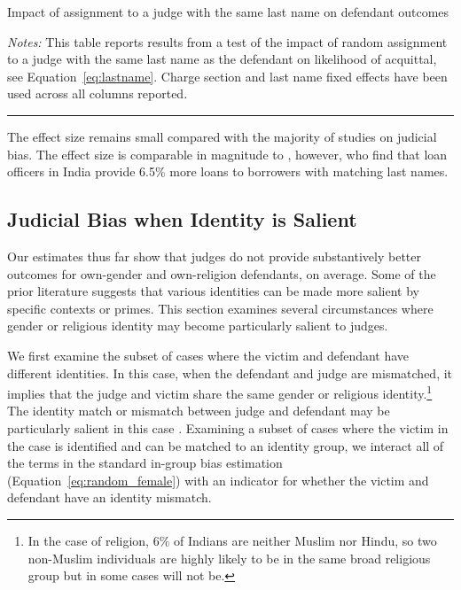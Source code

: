 \documentclass[12pt,english]{article}
\begin{document}
\begin{table}
  \begin{center}
    \caption{Impact of assignment to a judge with the same last name on defendant outcomes}
    \label{tab:last_name}
    
  \begin{minipage}{0.90\textwidth}
    \footnotesize \emph{Notes:} This table reports results from a test of the impact of random assignment to a judge with the same last name as the defendant on likelihood of acquittal, see Equation~\ref{eq:lastname}. Charge section and last name fixed effects have been used across all columns reported.\\ \hrule 
  \end{minipage}
    \end{center}
\end{table}

The effect size remains small compared with the majority of studies on judicial bias. The effect size is comparable in magnitude to \citet{fisman2017cultural}, however, who find that loan officers in India provide 6.5\% more loans to borrowers with matching last names.

\subsection{Judicial Bias when Identity is Salient}

Our estimates thus far show that judges do not provide substantively better outcomes for own-gender and own-religion defendants, on average. Some of the prior literature suggests that various identities can be made more salient by specific contexts or primes. This section examines several circumstances where gender or religious identity may become particularly salient to judges.

We first examine the subset of cases where the victim and defendant have different identities. In this case, when the defendant and judge are mismatched, it implies that the judge and victim share the same gender or religious identity.\footnote{In the case of religion, 6\% of Indians are neither Muslim nor Hindu, so two non-Muslim individuals are highly likely to be in the same broad religious group but in some cases will not be.} The identity match or mismatch between judge and defendant may be particularly salient in this case \citep{BaldusWoodworthZuckermanWeiner1997CLR,BaumgartnerGriggMastro2015PGI,FosterLeeHorowitzKing2006BSL}. Examining a subset of cases where the victim in the case is identified and can be matched to an identity group, we interact all of the terms in the standard in-group bias estimation (Equation~\ref{eq:random_female}) with an indicator for whether the victim and defendant have an identity mismatch.
\end{document}
